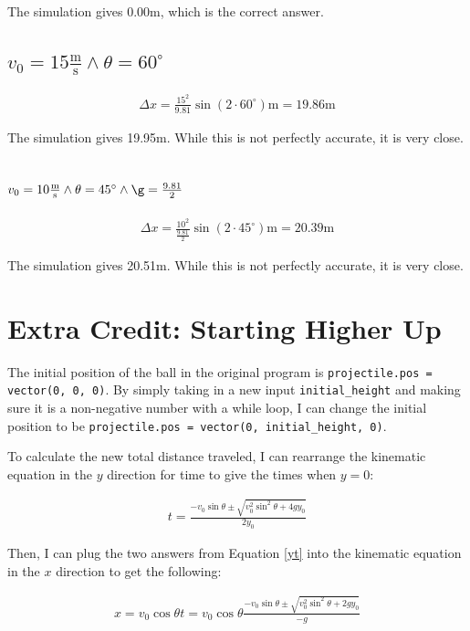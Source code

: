 \documentclass[12pt]{article}
\begin{document}
The simulation gives 0.00m, which is the correct answer.
\subsection{\(v_0 = 15 \frac{\text{m}}{\text{s}} \land \theta = 60 ^{\circ}\)}
\label{sec:org6e409c6}

\begin{align*}
\Delta x = \frac{15^2}{9.81}\sin(2 \cdot 60^{\circ}) \text{m} = 19.86 \text{m}
\end{align*}

The simulation gives 19.95m. While this is not perfectly accurate, it is very close.
\subsection{\(v_0 = 10 \frac{\text{m}}{\text{s}} \land \theta = 45 ^{\circ} \land \g = \frac{9.81}{2}\)}
\label{sec:orgd5208f9}

\begin{align*}
\Delta x = \frac{10^2}{\frac{9.81}{2}}\sin(2 \cdot 45^{\circ}) \text{m} = 20.39\text{m}
\end{align*}

The simulation gives 20.51m. While this is not perfectly accurate, it is very close.
\section{Extra Credit: Starting Higher Up}
\label{sec:orgfb9e6cf}

The initial position of the ball in the original program is \texttt{projectile.pos = vector(0, 0, 0)}. By simply taking in a new input \texttt{initial\_height} and making sure it is a non-negative number with a while loop, I can change the initial position to be \texttt{projectile.pos = vector(0, initial\_height, 0)}.

To calculate the new total distance traveled, I can rearrange the kinematic equation in the \(y\) direction for time to give the times when \(y = 0\):

\begin{align} \label{yt}
t = \frac{ -v_0\sin\theta \pm \sqrt{v_0^2\sin^2\theta + 4gy_0}}{2y_0}
\end{align}

Then, I can plug the two answers from Equation \ref{yt} into the kinematic equation in the \(x\) direction to get the following:

\begin{align} \label{x-initial-guess}
x = v_0\cos\theta t = v_0\cos\theta \frac{ -v_0\sin\theta \pm \sqrt{v_0^2\sin^2\theta + 2gy_0}}{-g}
\end{align}
\end{document}
